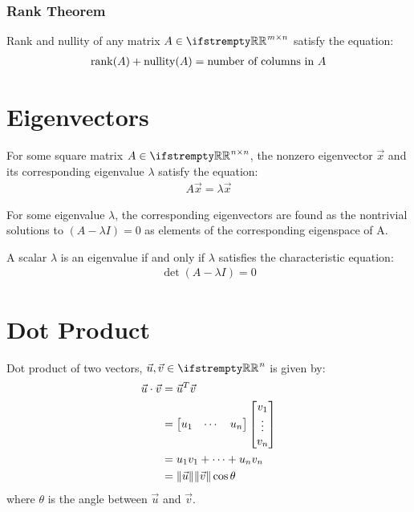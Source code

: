 \documentclass[12pt, a4paper]{article}
\begin{document}
\begin{multicols*}{3}
\subsubsection{Rank Theorem}
Rank and nullity of any matrix $A \in \RR^{m{\times}n}$ satisfy the equation:
\begin{align*}
  \operatorname{rank}(A) + \operatorname{nullity}(A) = \text{number of columns in }A
\end{align*}

\colbreak

\section{Eigenvectors}

For some square matrix $A \in \RR^{n{\times}n}$, the nonzero eigenvector $\vec{x}$ and its corresponding eigenvalue $\lambda$ satisfy the equation:
\begin{align*}
  A \vec{x} = \lambda \vec{x}
\end{align*}

For some eigenvalue $\lambda$, the corresponding eigenvectors are found as the nontrivial solutions to $(A - \lambda I) = 0$ as elements of the corresponding eigenspace of A.

A scalar $\lambda$ is an eigenvalue if and only if $\lambda$ satisfies the characteristic equation:
\begin{align*}
  \det(A - \lambda I) = 0
\end{align*}

\section{Dot Product}

Dot product of two vectors, $\vec{u}, \vec{v} \in \RR^n$ is given by:
\begin{align*}
  \vec{u} \cdot \vec{v} &= \vec{u}^T \vec{v} \\
                    &= \begin{bmatrix}u_1 & \cdots & u_n\end{bmatrix} \begin{bmatrix}v_1 \\ \vdots \\ v_n\end{bmatrix}\\
                    &= u_1v_1 + \cdots + u_nv_n \\
                    &= \lVert\vec{u}\rVert\lVert\vec{v}\rVert\cos\theta
\end{align*}
where $\theta$ is the angle between $\vec{u}$ and $\vec{v}$.


\end{multicols*}
\end{document}
